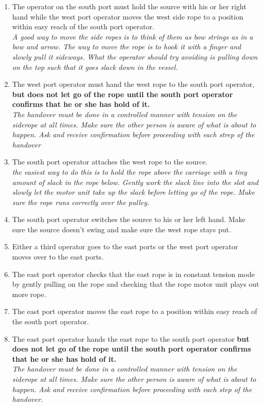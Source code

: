 \begin{enumerate}
\item \CheckBox[name=aesr6]{} The operator on the south port must hold the source with his or her right hand while the west port operator moves the west side rope to a position within easy reach of the south port operator.\\ {\it A good way to move the side ropes is to think of them as bow strings as in a bow and arrow. The way to move the rope is to hook it with a finger and slowly pull it sideways. What the operator should try avoiding is pulling down on the top such that it goes slack down in the vessel.}
\item \CheckBox[name=aesr7]{} The west port operator must hand the west rope to the south port operator, {\bf but does not let go of the rope until the south port operator confirms that he or she has hold of it.}\\ {\it The handover must be done in a controlled manner with tension on the siderope at all times. Make sure the other person is aware of what is about to happen. Ask and receive confirmation before proceeding with each strep of the handover}
\item \CheckBox[name=aesr8]{} The south port operator attaches the west rope to the source. \\ {\it the easiest way to do this is to hold the rope above the carriage with a tiny amount of slack in the rope below. Gently work the slack line into the slot and slowly let the motor unit take up the slack before letting go of the rope. Make sure the rope runs correctly over the pulley.}
\item \CheckBox[name=aesr9]{} The south port operator switches the source to his or her left hand. Make sure the source doesn't swing and make sure the west rope stays put.
\item \CheckBox[name=aesr10]{} Either a third operator goes to the east ports or the west port operator moves over to the east ports.
\item \CheckBox[name=aesr11]{} The east port operator checks that the east rope is in constant tension mode by gently pulling on the rope and checking that the rope motor unit plays out more rope.
\item \CheckBox[name=aesr12]{} The east port operator moves the east rope to a position within easy reach of the south port operator.
\item \CheckBox[name=aesr13]{} The east port operator hands the east rope to the south port operator {\bf but does not let go of the rope until the south port operator confirms that he or she has hold of it.} \\ {\it The handover must be done in a controlled manner with tension on the siderope at all times. Make sure the other person is aware of what is about to happen. Ask and receive confirmation before proceeding with each step of the handover.}

\end{enumerate}
